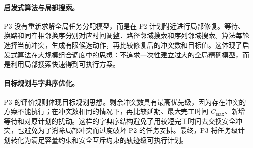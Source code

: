 \paragraph{启发式算法与局部搜索。}
P3 没有重新求解全局任务分配模型，而是在 P2 计划附近进行局部修复。等待、换路和同车相邻换序分别对应时间调整、路径邻域搜索和序列邻域搜索。算法每轮选择当前冲突，生成有限候选动作，再比较修复后的冲突数和目标值。这体现了启发式算法在大规模组合调度中的思想：不追求一次性建立过大的全局精确模型，而是利用局部搜索快速得到可执行方案。

\paragraph{目标规划与字典序优化。}
P3 的评价规则体现目标规划思想。剩余冲突数具有最高优先级，因为存在冲突的方案不能执行；在冲突数相同的情况下，再比较延期、最大完工时间 $C_{\max}$、新增等待和对原计划的扰动。这样的字典序结构避免了用较短完工时间去交换安全冲突，也避免为了消除局部冲突而过度破坏 P2 的任务安排。最终，P3 将任务级计划转化为满足容量约束和安全互斥约束的轨迹级可执行计划。
